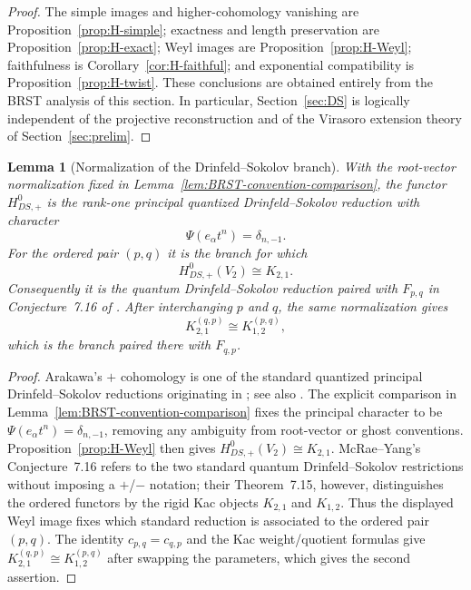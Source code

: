 \documentclass[12pt,leqno]{amsart}
\numberwithin{equation}{section}
\newtheorem{lem}[thm]{Lemma}
\begin{document}
\begin{proof}
The simple images and higher-cohomology vanishing are
Proposition~\ref{prop:H-simple}; exactness and length preservation are
Proposition~\ref{prop:H-exact}; Weyl images are
Proposition~\ref{prop:H-Weyl}; faithfulness is
Corollary~\ref{cor:H-faithful}; and exponential compatibility is
Proposition~\ref{prop:H-twist}.  These conclusions are obtained entirely
from the BRST analysis of this section.  In particular,
Section~\ref{sec:DS} is logically independent of the projective
reconstruction and of the Virasoro extension theory of
Section~\ref{sec:prelim}.
\end{proof}

\begin{lem}[Normalization of the Drinfeld--Sokolov branch]
\label{lem:FKW-normalization}
With the root-vector normalization fixed in
Lemma~\ref{lem:BRST-convention-comparison}, the functor
$H^0_{DS,+}$ is the rank-one principal quantized
Drinfeld--Sokolov reduction with character
\[
 \Psi(e_\alpha t^n)=\delta_{n,-1}.
\]
For the ordered pair $(p,q)$ it is the branch for which
\[
 H^0_{DS,+}(V_2)\cong K_{2,1}.
\]
Consequently it is the quantum Drinfeld--Sokolov reduction paired with
$F_{p,q}$ in Conjecture~7.16 of \cite{McRaeYang}.  After interchanging
$p$ and $q$, the same normalization gives
\[
 K^{(q,p)}_{2,1}\cong K^{(p,q)}_{1,2},
\]
which is the branch paired there with $F_{q,p}$.
\end{lem}

\begin{proof}
Arakawa's $+$ cohomology is one of the standard quantized principal
Drinfeld--Sokolov reductions originating in
\cite{FKW}; see also \cite{ArakawaVanishing,ArakawaW}.  The explicit
comparison in Lemma~\ref{lem:BRST-convention-comparison} fixes the
principal character to be $\Psi(e_\alpha t^n)=\delta_{n,-1}$, removing
any ambiguity from root-vector or ghost conventions.  Proposition~\ref{prop:H-Weyl}
then gives $H^0_{DS,+}(V_2)\cong K_{2,1}$.  McRae--Yang's
Conjecture~7.16 refers to the two standard quantum Drinfeld--Sokolov
restrictions without imposing a $+$/$-$ notation; their Theorem~7.15,
however, distinguishes the ordered functors by the rigid Kac objects
$K_{2,1}$ and $K_{1,2}$.  Thus the displayed Weyl image fixes which
standard reduction is associated to the ordered pair $(p,q)$.  The
identity $c_{p,q}=c_{q,p}$ and the Kac weight/quotient formulas give
$K^{(q,p)}_{2,1}\cong K^{(p,q)}_{1,2}$ after swapping the parameters,
which gives the second assertion.
\end{proof}
\end{document}
